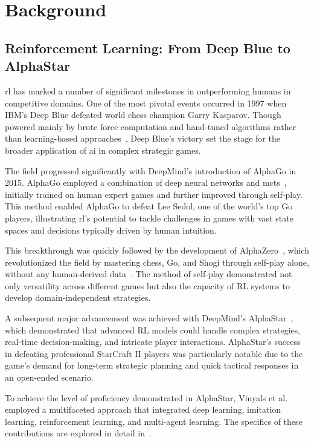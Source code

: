 \section{Background}%
\label{sec:background}

    \subsection*{Reinforcement Learning: From Deep Blue to AlphaStar}%

\Gls{rl} has marked a number of significant milestones in outperforming humans 
in competitive domains. One of the most pivotal events occurred in 1997 
when IBM's Deep Blue defeated world chess champion Garry Kasparov. Though 
powered mainly by brute force computation and hand-tuned algorithms rather than 
learning-based approaches~\cite{campbell2002}, Deep Blue's victory set the 
stage for the broader application of \gls{ai} in complex strategic games.

The field progressed significantly with DeepMind's introduction of AlphaGo 
in 2015. AlphaGo employed a combination of deep neural networks and 
\gls{mcts}~\cite{silver2016}, initially trained on human expert games and 
further improved through self-play.
This method enabled AlphaGo to defeat Lee Sedol, one of the world's top Go 
players, illustrating \gls{rl}'s potential to tackle challenges in games with 
vast state spaces and decisions typically driven by human intuition.

This breakthrough was quickly followed by the development of 
AlphaZero~\cite{silver2017}, which revolutionized the field by mastering chess,
Go, and Shogi through self-play alone, without any human-derived 
data~\cite{silver2017a}. The method of self-play demonstrated not only 
versatility across different games but also the capacity of RL systems to 
develop domain-independent strategies.

A subsequent major advancement was achieved with DeepMind's 
AlphaStar~\cite{vinyals2019}, 
which demonstrated that advanced RL models could handle complex strategies, 
real-time decision-making, and intricate player interactions. 
AlphaStar's success in defeating professional StarCraft II players
was particularly notable due to the game's demand for long-term strategic 
planning and quick tactical responses in an open-ended scenario.

To achieve the level of proficiency demonstrated in AlphaStar, 
Vinyals et al.~\cite{vinyals2019} employed a multifaceted approach 
that integrated deep learning, imitation learning, 
reinforcement learning, and multi-agent learning. 
The specifics of these contributions are explored in detail 
in~.

